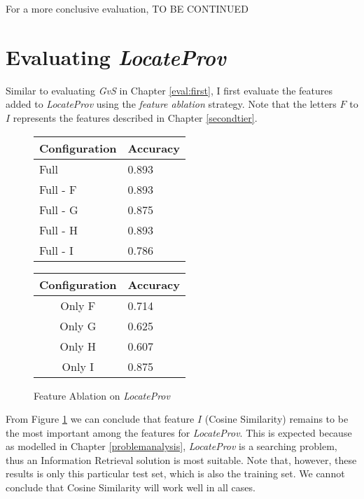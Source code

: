 For a more conclusive evaluation, TO BE CONTINUED

\section{Evaluating {\it LocateProv}}
\label{eval:second}
Similar to evaluating {\it GvS} in Chapter \ref{eval:first}, I first evaluate the features added to {\it LocateProv} using the {\it feature ablation} strategy. Note that the letters $F$ to $I$ represents the features described in Chapter \ref{secondtier}.

\begin{figure}[ht]
\begin{minipage}[b]{0.45\linewidth}\centering
\begin{tabular}{ l | l }
Configuration & Accuracy \\
\hline
Full		& 0.893 \\
Full - F	& 0.893 \\
Full - G	& 0.875 \\
Full - H	& 0.893 \\
Full - I	& 0.786 \\
\end{tabular}
\end{minipage}
\hspace{0.5cm}
\begin{minipage}[b]{0.45\linewidth}\centering
\begin{tabular}{ c | l }
Configuration & Accuracy \\
\hline
Only F	& 0.714 \\
Only G	& 0.625 \\
Only H	& 0.607 \\
Only I	& 0.875 \\
\end{tabular}
\end{minipage}
\caption{Feature Ablation on {\it LocateProv}}
\label{fig:ablation_second}
\end{figure}
From Figure \ref{fig:ablation_second} we can conclude that feature $I$ (Cosine Similarity) remains to be the most important among the features for {\it LocateProv}. This is expected because as modelled in Chapter \ref{problemanalysis}, {\it LocateProv} is a searching problem, thus an Information Retrieval solution is most suitable. Note that, however, these results is only this particular test set, which is also the training set. We cannot conclude that Cosine Similarity will work well in all cases.

